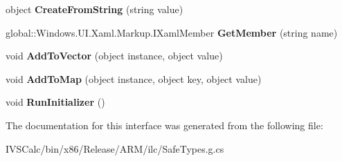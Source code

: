\begin{DoxyCompactItemize}
object {\bfseries Create\+From\+String} (string value)
\item 
\mbox{\label{interface_windows_1_1_u_i_1_1_xaml_1_1_markup_1_1_i_xaml_type_a431f90f38a00401842b28f5ee3917d54}} 
global\+::\+Windows.\+U\+I.\+Xaml.\+Markup.\+I\+Xaml\+Member {\bfseries Get\+Member} (string name)
\item 
\mbox{\label{interface_windows_1_1_u_i_1_1_xaml_1_1_markup_1_1_i_xaml_type_a9542f31b1f9a3d9698ca632ae1a207e2}} 
void {\bfseries Add\+To\+Vector} (object instance, object value)
\item 
\mbox{\label{interface_windows_1_1_u_i_1_1_xaml_1_1_markup_1_1_i_xaml_type_ab81b106f354f661a28e2fe7c1cf529fb}} 
void {\bfseries Add\+To\+Map} (object instance, object key, object value)
\item 
\mbox{\label{interface_windows_1_1_u_i_1_1_xaml_1_1_markup_1_1_i_xaml_type_a43defd106c74e1f61c00f36498126028}} 
void {\bfseries Run\+Initializer} ()
\end{DoxyCompactItemize}


The documentation for this interface was generated from the following file\+:\begin{DoxyCompactItemize}
\item 
I\+V\+S\+Calc/bin/x86/\+Release/\+A\+R\+M/ilc/Safe\+Types.\+g.\+cs\end{DoxyCompactItemize}
